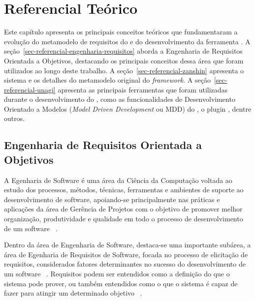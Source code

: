 
% 
\chapter{Referencial Teórico}
\label{sec-referencial}

Este capítulo apresenta os principais conceitos teóricos que fundamentaram a evolução do metamodelo de requisitos do \zanshin e do desenvolvimento da ferramenta \unagi. A seção~\ref{sec-referencial-engenharia-requisitos} aborda a Engenharia de Requisitos Orientada a Objetivos, destacando os principais conceitos dessa área que foram utilizados ao longo deste trabalho. A seção~\ref{sec-referencial-zanshin} apresenta o sistema \zanshin e os detalhes do metamodelo original do \textit{framework}. A seção~\ref{sec-referencial-unagi} apresenta as principais ferramentas que foram utilizadas durante o desenvolvimento do \unagi, como as funcionalidades de Desenvolvimento Orientado a Modelos (\textit{Model Driven Development} ou MDD) do \eclipse, o plugin \sirius, dentre outros.


\section{Engenharia de Requisitos Orientada a Objetivos}
\label{sec-referencial-engenharia-objetivos}

A Egenharia de Software é uma área da Ciência da Computação voltada ao estudo dos processos, métodos, técnicas, ferramentas e ambientes de suporte ao desenvolvimento de software, apoiando-se principalmente nas práticas e aplicações da área de Gerência de Projetos com o objetivo de promover melhor organização, produtividade e qualidade em todo o processo de desenvolvimento de um software ~\cite{falboEngSoft}.

Dentro da área de Engenharia de Software, destaca-se uma importante subárea, a área de Egenharia de Requisitos de Software, focada no processo de elicitação de requisitos, considerados fatores determinantes no sucesso do desenvolvimento de um software ~\cite{falboEngReq}. Requisitos podem ser entendidos como a definição do que o sistema pode prover, ou também entendidos como o que o sistema é capaz de fazer para atingir um determinado objetivo ~\cite{pfleeger2004engenharia}.

